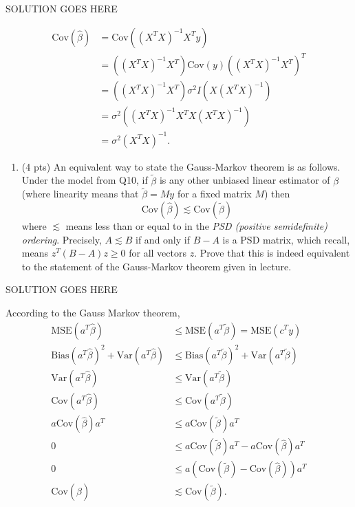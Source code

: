 \documentclass[
]{article}
\providecommand{\tightlist}{%
  \setlength{\itemsep}{0pt}\setlength{\parskip}{0pt}}
\begin{document}
SOLUTION GOES HERE

\begin{align*}
    \mathrm{Cov}(\hat{\beta}) & = \mathrm{Cov}\left(\left(X^TX\right)^{-1}X^Ty\right) \\
    & = \left(\left(X^TX\right)^{-1}X^T\right)\mathrm{Cov}(y)\left(\left(X^TX\right)^{-1}X^T\right)^T \\
    & = \left(\left(X^TX\right)^{-1}X^T\right)\sigma^2I\left(X\left(X^TX\right)^{-1}\right) \\
    & = \sigma^2\left(\left(X^TX\right)^{-1}X^TX\left(X^TX\right)^{-1}\right) \\
    & = \sigma^2\left(X^TX\right)^{-1}.
\end{align*}

\begin{enumerate}
\def\labelenumi{\arabic{enumi}.}
\setcounter{enumi}{10}
\tightlist
\item
  (4 pts) An equivalent way to state the Gauss-Markov theorem is as
  follows. Under the model from Q10, if \(\tilde\beta\) is any other
  unbiased linear estimator of \(\beta\) (where linearity means that
  \(\tilde\beta = My\) for a fixed matrix \(M\)) then \[
  \mathrm{Cov}(\hat\beta) \lesssim \mathrm{Cov}(\tilde\beta)
  \] where \(\lesssim\) means less than or equal to in the \emph{PSD
  (positive semidefinite) ordering}. Precisely, \(A \lesssim B\) if and
  only if \(B-A\) is a PSD matrix, which recall, means
  \(z^T (B-A) z \geq 0\) for all vectors \(z\). Prove that this is
  indeed equivalent to the statement of the Gauss-Markov theorem given
  in lecture.
\end{enumerate}

SOLUTION GOES HERE

According to the Gauss Markov theorem, \begin{align*}
  \mathrm{MSE}(a^T\hat{\beta}) & \le \mathrm{MSE}(a^T\tilde{\beta}) = \mathrm{MSE}(c^Ty) \\
  \mathrm{Bias}(a^T\hat\beta)^2 + \mathrm{Var}(a^T\hat{\beta}) & \le \mathrm{Bias}(a^T\tilde{\beta})^2 + \mathrm{Var}(a^T\tilde{\beta}) \\
  \mathrm{Var}(a^T\hat{\beta}) & \le \mathrm{Var}(a^T\tilde{\beta}) \\
  \mathrm{Cov}(a^T\hat{\beta}) & \le \mathrm{Cov}(a^T\tilde{\beta}) \\
  a\mathrm{Cov}(\hat{\beta})a^T & \le a\mathrm{Cov}(\tilde{\beta})a^T \\
  0 & \le a\mathrm{Cov}(\tilde{\beta})a^T - a\mathrm{Cov}(\hat{\beta})a^T \\
  0 & \le a\left(\mathrm{Cov}(\tilde{\beta}) - \mathrm{Cov}(\hat{\beta})\right)a^T \\
  \mathrm{Cov}(\hat\beta) & \lesssim \mathrm{Cov}(\tilde\beta).
\end{align*}
\end{document}
